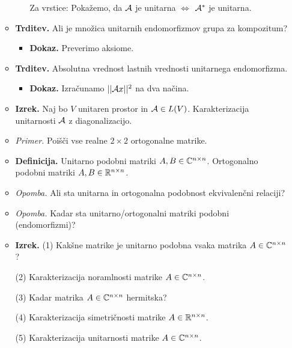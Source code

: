 \begin{enumerate}
\begin{itemize}
\begin{itemize}
            Za vrstice: Pokažemo, da $\mathcal{A}$ je unitarna $\Leftrightarrow$ $\mathcal{A}^*$ je unitarna.
        \end{itemize}
        \item \colorbox{blue!30}{\textbf{Trditev.}} Ali je množica unitarnih endomorfizmov grupa za kompozitum?
        \begin{itemize}
            \item \colorbox{green!30}{\textbf{Dokaz.}} Preverimo aksiome.
        \end{itemize}
        \item \colorbox{blue!30}{\textbf{Trditev.}} Absolutna vrednost lastnih vrednosti unitarnega endomorfizma.
        \begin{itemize}
            \item \colorbox{green!30}{\textbf{Dokaz.}} Izračunamo $||\mathcal{A} x||^2$ na dva načina.
        \end{itemize}
        \item \colorbox{blue!30}{\textbf{Izrek.}} Naj bo $V$ unitaren prostor in $\mathcal{A} \in L(V)$. Karakterizacija unitarnosti $\mathcal{A}$ z diagonalizacijo.
        \item \colorbox{yellow!30}{\emph{Primer.}} Poišči vse realne $2 \times 2$ ortogonalne matrike.
        \item \colorbox{purple!30}{\textbf{Definicija.}} Unitarno podobni matriki $A, B \in \mathbb{C}^{n \times n}$. Ortogonalno podobni matriki $A, B \in \mathbb{R}^{n \times n}$.
        \item \colorbox{yellow!30}{\emph{Opomba.}} Ali sta unitarna in ortogonalna podobnost ekvivalenčni relaciji?
        \item \colorbox{yellow!30}{\emph{Opomba.}} Kadar sta unitarno/ortogonalni matriki podobni (endomorfizmi)?
        \item \colorbox{blue!30}{\textbf{Izrek.}} (1) Kakšne matrike je unitarno podobna vsaka matrika $A \in \mathbb{C}^{n \times n}$?
        
        (2) Karakterizacija noramlnosti matrike $A \in \mathbb{C}^{n \times n}$.

        (3) Kadar matrika $A \in \mathbb{C}^{n \times n}$ hermitska?

        (4) Karakterizacija simetričnosti matrike $A \in \mathbb{R}^{n \times n}$.

        (5) Karakterizacija unitarnosti matrike $A \in \mathbb{C}^{n \times n}$.
    \end{itemize}
\end{enumerate}